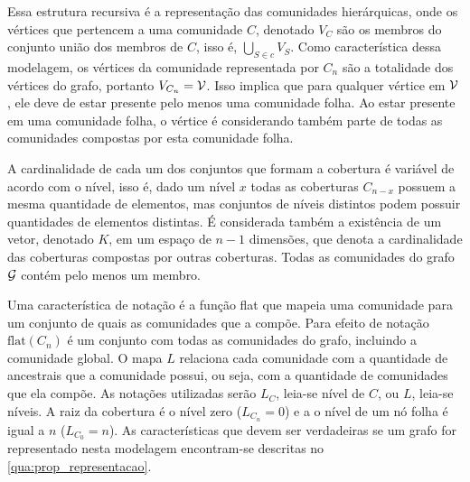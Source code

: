 \documentclass[notes.tex]{subfiles}
\begin{document}
Essa estrutura recursiva é a representação das comunidades hierárquicas, onde os vértices que pertencem a uma comunidade $C$, denotado $V_C$ são os membros do conjunto união dos membros de  $C$, isso é, $\bigcup_{S \in c} V_S$.
Como característica dessa modelagem, os vértices da comunidade representada por $C_n$ são a totalidade dos vértices do grafo, portanto $V_{C_n} = \operatorname{\mathcal{V}}$.
Isso implica que para qualquer vértice em $\operatorname{\mathcal{V}}$, ele deve de estar presente pelo menos uma comunidade folha.
Ao estar presente em uma comunidade folha, o vértice é considerando também parte de todas as comunidades compostas por esta comunidade folha.

A cardinalidade de cada um dos conjuntos que formam a cobertura é variável de acordo com o nível, isso é, dado um nível $x$ todas as coberturas  $C_{n-x}$ possuem a mesma quantidade de elementos, mas conjuntos de níveis distintos podem possuir quantidades de elementos distintas.
É considerada também a existência de um vetor, denotado $K$, em um espaço de $n-1$ dimensões, que denota a cardinalidade das coberturas compostas por outras coberturas.
Todas as comunidades do grafo $\operatorname{\mathcal{G}}$ contém pelo menos um membro.

Uma característica de notação é a função flat que mapeia uma comunidade para um conjunto de quais as comunidades que a compõe.
Para efeito de notação $\text{flat}(C_n)$ é um conjunto com todas as comunidades do grafo, incluindo a comunidade global.
O mapa $L$ relaciona cada comunidade com a quantidade de ancestrais que a comunidade possui, ou seja, com a quantidade de comunidades que ela compõe.
As notações utilizadas serão  $L_C$, leia-se nível de $C$, ou $L$, leia-se níveis.
A raiz da cobertura é o nível zero ($L_{C_n} = 0$) e a o nível de um nó folha é igual a $n$ ($L_{C_0}=n$).
As características que devem ser verdadeiras se um grafo for representado nesta modelagem encontram-se descritas no \autoref{qua:prop_representacao}.
\end{document}
